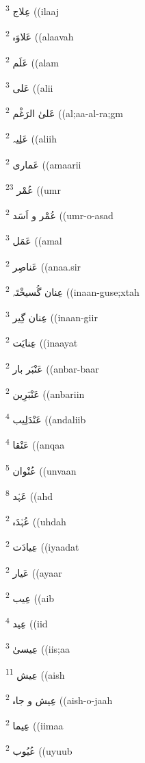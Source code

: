 \documentclass[12pt]{article}
\begin{document}
\begin{RTL}
\begin{multicols}{5}
{\ur عِلاج}   \textsuperscript{3} ((ilaaj

{\ur عَلاوَہ}   \textsuperscript{2} ((alaavah

{\ur عَلَم}   \textsuperscript{2} ((alam

{\ur عَلی}   \textsuperscript{3} ((alii

{\ur عَلیٰ الرَغْم}   \textsuperscript{2} ((al;aa-al-ra;gm

{\ur عَلِیہ}   \textsuperscript{2} ((aliih

{\ur عَماری}   \textsuperscript{2} ((amaarii

{\ur عُمْر}   \textsuperscript{23} ((umr

{\ur عُمْر و اَسَد}   \textsuperscript{2} ((umr-o-asad

{\ur عَمَل}   \textsuperscript{3} ((amal

{\ur عَناصِر}   \textsuperscript{2} ((anaa.sir

{\ur عِنان گُسیخْتَہ}   \textsuperscript{2} ((inaan-guse;xtah

{\ur عِنان گِیر}   \textsuperscript{3} ((inaan-giir

{\ur عِنایَت}   \textsuperscript{2} ((inaayat

{\ur عَنْبَر بار}   \textsuperscript{2} ((anbar-baar

{\ur عَنْبَرِین}   \textsuperscript{2} ((anbariin

{\ur عَنْدَلِیب}   \textsuperscript{4} ((andaliib

{\ur عَنْقا}   \textsuperscript{4} ((anqaa

{\ur عُنْوان}   \textsuperscript{5} ((unvaan

{\ur عَہْد}   \textsuperscript{8} ((ahd

{\ur عُہْدَہ}   \textsuperscript{2} ((uhdah

{\ur عِیادَت}   \textsuperscript{2} ((iyaadat

{\ur عَیار}   \textsuperscript{2} ((ayaar

{\ur عِیب}   \textsuperscript{2} ((aib

{\ur عِید}   \textsuperscript{4} ((iid

{\ur عِیسیٰ}   \textsuperscript{3} ((iis;aa

{\ur عِیش}   \textsuperscript{11} ((aish

{\ur عِیش و جاہ}   \textsuperscript{2} ((aish-o-jaah

{\ur عِیما}   \textsuperscript{2} ((iimaa

{\ur عُیُوب}   \textsuperscript{2} ((uyuub


\end{multicols}
\end{RTL}
\end{document}
